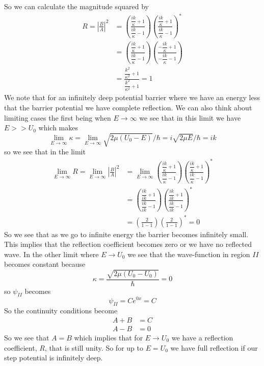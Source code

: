 \documentclass[11pt]{article}
\numberwithin{equation}{section}
\begin{document}
So we can calculate the magnitude squared by
\begin{align*}
R = \left|\frac{B}{A}\right|^2 &= \left(\frac{\dfrac{ik}{\kappa}+1}{\dfrac{ik}{\kappa}-1}\right)\left(\frac{\dfrac{ik}{\kappa}+1}{\dfrac{ik}{\kappa}-1}\right)^*\\
&= \left(\frac{\dfrac{ik}{\kappa}+1}{\dfrac{ik}{\kappa}-1}\right)\left(\frac{-\dfrac{ik}{\kappa}+1}{-\dfrac{ik}{\kappa}-1}\right)\\
&= \frac{\dfrac{k^2}{\kappa^2}+1}{\dfrac{k^2}{\kappa^2}+1} = 1
\end{align*}
We note that for an infinitely deep potential barrier where we have an energy less that the 
barrier potential we have complete reflection. We can also think about limiting cases the 
first being when $E\rightarrow\infty$ we see that in this limit we have $E>>U_0$ which makes
$$\lim_{E\rightarrow\infty}\kappa = \lim_{E\rightarrow\infty}\sqrt{2\mu(U_0-E)}/\hbar = i\sqrt{2\mu E}/\hbar = ik$$
so we see that in the limit
\begin{align*}
\lim_{E\rightarrow\infty} R =\lim_{E\rightarrow\infty} \left|\frac{B}{A}\right|^2 &= \lim_{E\rightarrow\infty}\left(\frac{\dfrac{ik}{\kappa}+1}{\dfrac{ik}{\kappa}-1}\right)\left(\frac{\dfrac{ik}{\kappa}+1}{\dfrac{ik}{\kappa}-1}\right)^*\\
&= \left(\frac{\dfrac{ik}{ik}+1}{\dfrac{ik}{ik}-1}\right)\left(\frac{\dfrac{ik}{ik}+1}{\dfrac{ik}{ik}-1}\right)^*\\
&= \left(\frac{2}{1-1}\right)\left(\frac{2}{1-1}\right)^* = 0
\end{align*}
So we see that as we go to infinite energy the barrier becomes infinitely small. This implies
that the reflection coefficient becomes zero or we have no reflected wave. In the other limit
where $E\rightarrow{U_0}$ we see that the wave-function in region $II$ becomes constant 
because 
$$\kappa = \frac{\sqrt{2\mu(U_0-U_0)}}{\hbar} = 0$$
so $\psi_{II}$ becomes
$$\psi_{II} = Ce^{0x} = C$$
So the continuity conditions become
\begin{align*}
A + B &= C\\
A - B &= 0
\end{align*}
So we see that $A=B$ which implies that for $E\rightarrow{U_0}$ we have a reflection 
coefficient, $R$, that is still unity. So for up to $E=U_0$ we have full reflection if our 
step potential is infinitely deep.

\pagebreak
\end{document}
